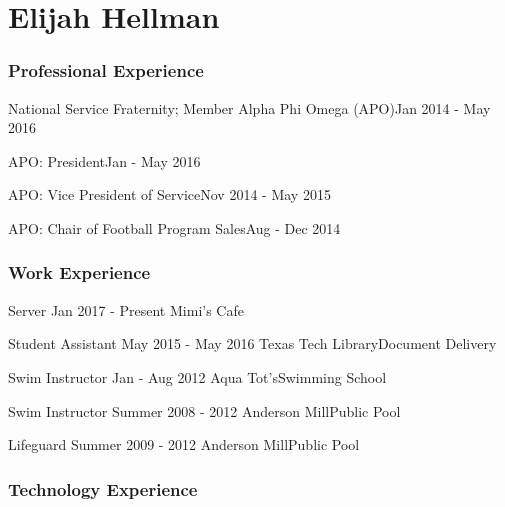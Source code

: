 \documentclass{tccv}
\begin{document}
\part{Elijah Hellman}

\section{Professional Experience}

\begin{yearlist}

\item[National Service Fraternity; Member]{}
	{Alpha Phi Omega (APO)}{Jan 2014 - May 2016}

\item
	[]{}
	{APO: President}{Jan - May 2016}
	
\item
	[]{}
	{APO: Vice President of Service}{Nov 2014 - May 2015}
	
\item
	[]{}
	{APO: Chair of Football Program Sales}{Aug - Dec 2014}

\end{yearlist}

	
\section{Work Experience}

\begin{yearlist}

\item
	[Server]{Jan 2017 - Present}
	{Mimi's Cafe}{}
	
\item
	[Student Assistant]{May 2015 - May 2016}
	{Texas Tech Library}{Document Delivery}
	
\item
	[Swim Instructor]{Jan - Aug 2012}
	{Aqua Tot's}{Swimming School}
	
\item
	[Swim Instructor]{Summer 2008 - 2012}
	{Anderson Mill}{Public Pool}

\item
	[Lifeguard]{Summer 2009 - 2012}
	{Anderson Mill}{Public Pool}

\end{yearlist}

\section{Technology Experience}
\end{document}

